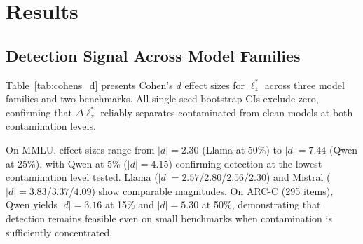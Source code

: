 \section{Results}
\label{sec:results}

\begin{table}[t]
\centering
\caption{Cohen's $d$ for $\Delta\ell_z^*$ across model families ($n{=}10$ clean seeds). Single-seed conditions: percentile bootstrap 95\% CI (10,000 resamples). $^{\dagger}$Multi-seed conditions: mean $\pm$ SD ($n{=}3$ independent runs). All single-seed CIs exclude zero.}
\label{tab:cohens_d}
\footnotesize
{}
\end{table}

\subsection{Detection Signal Across Model Families}
\label{sec:detection}

Table~\ref{tab:cohens_d} presents Cohen's $d$ effect sizes for $\ell_z^*$ across three model families and two benchmarks.
All single-seed bootstrap CIs exclude zero, confirming that $\Delta\ell_z^*$ reliably separates contaminated from clean models at both contamination levels.

On MMLU, effect sizes range from $|d|{=}2.30$ (Llama at 50\%) to $|d|{=}7.44$ (Qwen at 25\%), with Qwen at 5\% ($|d|{=}4.15$) confirming detection at the lowest contamination level tested. Llama ($|d|{=}2.57$/$2.80$/$2.56$/$2.30$) and Mistral ($|d|{=}3.83$/$3.37$/$4.09$) show comparable magnitudes.
On ARC-C (295 items), Qwen yields $|d|{=}3.16$ at 15\% and $|d|{=}5.30$ at 50\%, demonstrating that detection remains feasible even on small benchmarks when contamination is sufficiently concentrated.

